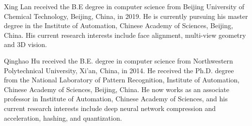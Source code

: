 \documentclass[journal,transmag]{IEEEtran}
\begin{document}
\begin{IEEEbiography}{Xing Lan}
 received the B.E degree in computer science from Beijing University of Chemical Technology, Beijing, China, in 2019.
 He is currently pursuing his master degree in the Institute of Automation, Chinese Academy of Sciences, Beijing, China.
 His current research interests include face alignment, multi-view geometry and 3D vision.
\end{IEEEbiography}

\begin{IEEEbiography}{Qinghao Hu}
  received the B.E. degree in computer
  science from Northwestern Polytechnical University,
  Xi’an, China, in 2014. He received 
  the Ph.D. degree from the National Laboratory of
  Pattern Recognition, Institute of Automation, Chinese Academy
  of Sciences, Beijing, China. He now works as an associate professor in Institute of Automation, Chinese Academy
  of Sciences, and his current research interests include deep neural network compression and acceleration, hashing, and quantization.
\end{IEEEbiography}

\end{document}
